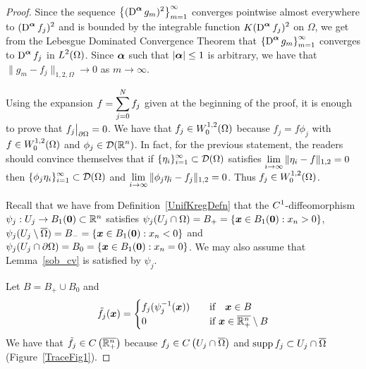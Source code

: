 \begin{proof}
Since the sequence
$\displaystyle \left\{ (\operatorname{D}^{{\bm{\alpha}}} g_m)^2 \right\}_{m=1}^\infty$
converges pointwise almost everywhere to
$\displaystyle (\operatorname{D}^{{\bm{\alpha}}} f_j)^2$
and is bounded by the integrable function
$\displaystyle K (\operatorname{D}^{{\bm{\alpha}}} f_j)^2$ on $\Omega$, we get from
the Lebesgue Dominated Convergence Theorem that
$\displaystyle \left\{ \operatorname{D}^{{\bm{\alpha}}} g_m \right\}_{m=1}^\infty$ converges
to $\displaystyle \operatorname{D}^{{\bm{\alpha}}} f_j$ in $\displaystyle L^2(\Omega)$.
Since ${\bm{\alpha}}$ such that $|{\bm{\alpha}}|\leq 1$ is arbitrary, we
have that $\|g_m - f_j\|_{1,2,\Omega} \rightarrow 0$ as $m\rightarrow \infty$.

\stage{$\mathbf{\Rightarrow}$}
Using the expansion
$\displaystyle f = \sum_{j=0}^N f_j$ given at the beginning of the proof, it
is enough to prove that $\displaystyle f_j \big|_{\partial \Omega} = 0$.
We have that 
$\displaystyle f_j \in W^{1,2}_0(\Omega)$ because $f_j = f \phi_j$ with
$\displaystyle f \in W^{1,2}_0(\Omega)$ and
$\displaystyle \phi_j \in \mathcal{D}(\mathbb{R}^n)$.  In fact, for the previous
statement, the readers should convince themselves that if
$\displaystyle \{ \eta_i \}_{i=1}^\infty \subset \mathcal{D}(\Omega)$
satisfies $\displaystyle \lim_{i\rightarrow \infty} \|\eta_i -f \|_{1,2} = 0$
then
$\displaystyle \{ \phi_j \eta_i \}_{i=1}^\infty \subset \mathcal{D}(\Omega)$
and
$\displaystyle \lim_{i\rightarrow \infty} \|\phi_j \eta_i -f_j \|_{1,2} = 0$.
Thus $\displaystyle f_j \in W^{1,2}_0(\Omega)$.

Recall that we have from Definition~\ref{UnifKregDefn} that
the $\displaystyle C^1$-diffeomorphism
$\psi_j : U_j \to B_1({\bm{0}}) \subset \mathbb{R}^n$
satisfies $\psi_j(U_j\cap \Omega) = B_+
= \left\{ {\bm{x}}\in B_1({\bm{0}}) : x_n>0 \right\}$,
$\psi_j(U_j \setminus \overline{\Omega}) = B_-
= \left\{ {\bm{x}}\in B_1({\bm{0}}) : x_n<0 \right\}$
and $\psi_j(U_j\cap \partial \Omega) = B_0
= \left\{ {\bm{x}}\in B_1({\bm{0}}) : x_n=0 \right\}$.
We may also assume that Lemma~\ref{sob_cv} is satisfied by $\psi_j$.

Let $B = B_+ \cup B_0$ and
\[
\tilde{f}_j({\bm{x}}) =
\begin{cases}
f_j(\psi_j^{-1}({\bm{x}})) & \quad \text{if} \quad {\bm{x}} \in B \\
0 & \quad \text{if} \ {\bm{x}} \in \overline{\mathbb{R}^n_+} \setminus B
\end{cases}
\]
We have that $\displaystyle \tilde{f}_j \in C\left(\overline{\mathbb{R}^n_+}\right)$
because $\displaystyle f_j \in C\left(U_j\cap \overline{\Omega}\right)$ and
$\operatorname{supp} f_j \subset U_j\cap \overline{\Omega}$ (Figure~\ref{TraceFig1}).


\end{proof}
